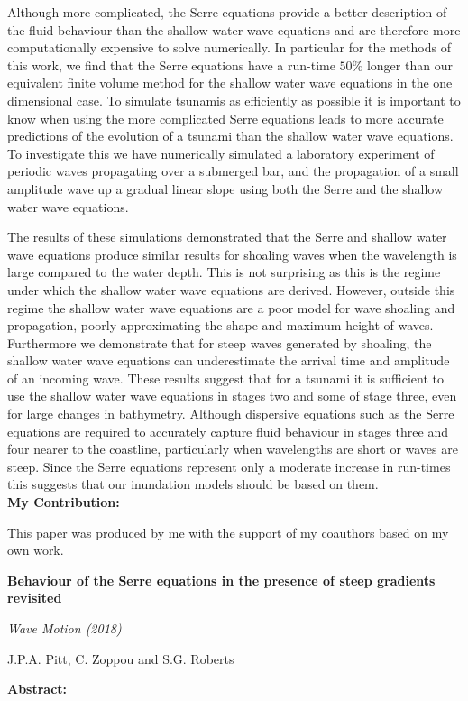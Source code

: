 Although more complicated, the Serre equations provide a better description of the fluid behaviour than the shallow water wave equations and are therefore more computationally expensive to solve numerically. In particular for the methods of this work, we find that the Serre equations have a run-time $50\%$ longer than our equivalent finite volume method for the shallow water wave equations in the one dimensional case. To simulate tsunamis as efficiently as possible it is important to know when using the more complicated Serre equations leads to more accurate predictions of the evolution of a tsunami than the shallow water wave equations. To investigate this we have numerically simulated a laboratory experiment of periodic waves propagating over a submerged bar, and the propagation of a small amplitude wave up a gradual linear slope using both the Serre and the shallow water wave equations.

The results of these simulations demonstrated that the Serre and shallow water wave equations produce similar results for shoaling waves when the wavelength is large compared to the water depth. This is not surprising as this is the regime under which the shallow water wave equations are derived. However, outside this regime the shallow water wave equations are a poor model for wave shoaling and propagation, poorly approximating the shape and maximum height of waves. Furthermore we demonstrate that for steep waves generated by shoaling, the shallow water wave equations can underestimate the arrival time and amplitude of an incoming wave. These results suggest that for a tsunami it is sufficient to use the shallow water wave equations in stages two and some of stage three, even for large changes in bathymetry. Although dispersive equations such as the Serre equations are required to accurately capture fluid behaviour in stages three and four nearer to the coastline, particularly when wavelengths are short or waves are steep. Since the Serre equations represent only a moderate increase in run-times this suggests that our inundation models should be based on them.
 \\
 \textbf{My Contribution:}
 
 This paper was produced by me with the support of my coauthors based on my own work.
 
 \vspace*{\baselineskip}
 
 \begin{center}
 	\textbf{
 		\Large Behaviour of the Serre equations in the presence of steep
 		gradients revisited}
 	
 	\vspace*{\baselineskip}
 	
 	\textit{Wave Motion (2018)}
 	
 	{J.P.A. Pitt, C. Zoppou and S.G. Roberts}
 	\vspace*{0.5\baselineskip}
 \end{center}
 \textbf{Abstract:}
 
